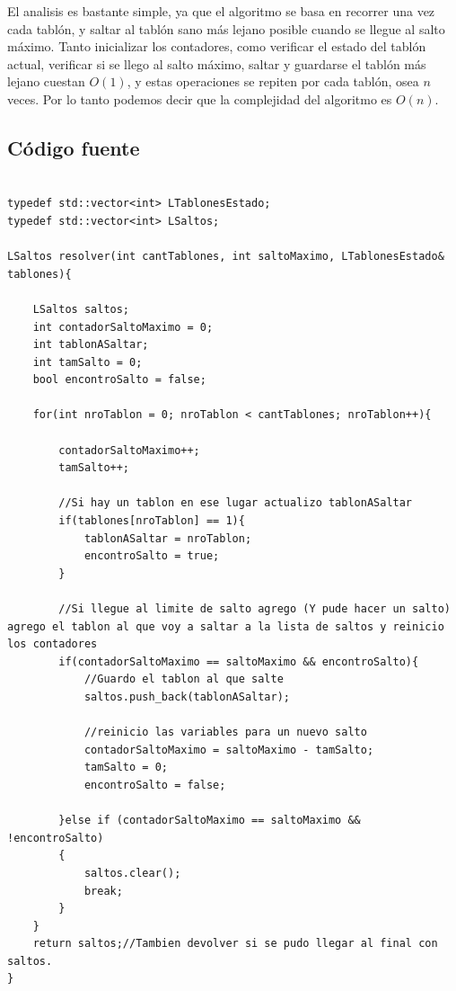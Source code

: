 El analisis es bastante simple, ya que el algoritmo se basa en recorrer una vez cada tablón, y saltar al tablón sano más lejano posible cuando se llegue al salto máximo. Tanto inicializar los contadores, como verificar el estado del tablón actual, verificar si se llego al salto máximo, saltar y guardarse el tablón más lejano cuestan $O(1)$, y estas operaciones se repiten por cada tablón, osea $n$ veces. Por lo tanto podemos decir que la complejidad del algoritmo es $O(n)$.

\subsection{C\'odigo fuente}

\begin{lstlisting}

typedef std::vector<int> LTablonesEstado;
typedef std::vector<int> LSaltos;

LSaltos resolver(int cantTablones, int saltoMaximo, LTablonesEstado& tablones){

	LSaltos saltos;
	int contadorSaltoMaximo = 0;
	int tablonASaltar;
	int tamSalto = 0;
	bool encontroSalto = false;

	for(int nroTablon = 0; nroTablon < cantTablones; nroTablon++){

		contadorSaltoMaximo++;
		tamSalto++;
		
		//Si hay un tablon en ese lugar actualizo tablonASaltar
		if(tablones[nroTablon] == 1){
			tablonASaltar = nroTablon;
			encontroSalto = true;
		}
		
		//Si llegue al limite de salto agrego (Y pude hacer un salto) agrego el tablon al que voy a saltar a la lista de saltos y reinicio los contadores
		if(contadorSaltoMaximo == saltoMaximo && encontroSalto){			
			//Guardo el tablon al que salte
			saltos.push_back(tablonASaltar);

			//reinicio las variables para un nuevo salto
			contadorSaltoMaximo = saltoMaximo - tamSalto;
			tamSalto = 0;
			encontroSalto = false;

		}else if (contadorSaltoMaximo == saltoMaximo && !encontroSalto)
		{
			saltos.clear();
			break;
		}
	}
	return saltos;//Tambien devolver si se pudo llegar al final con saltos.
}

\end{lstlisting}

